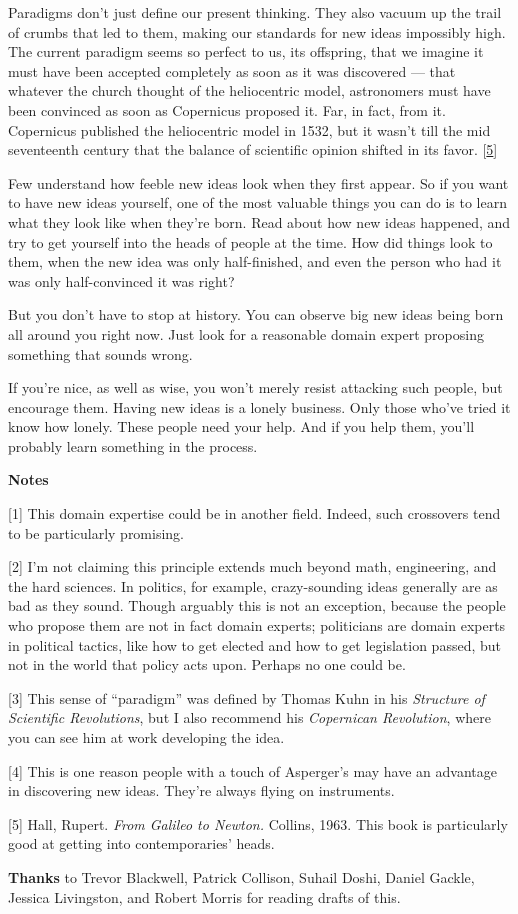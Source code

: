 Paradigms don't just define our present thinking. They also vacuum up
the trail of crumbs that led to them, making our standards for new ideas
impossibly high. The current paradigm seems so perfect to us, its
offspring, that we imagine it must have been accepted completely as soon
as it was discovered --- that whatever the church thought of the
heliocentric model, astronomers must have been convinced as soon as
Copernicus proposed it. Far, in fact, from it. Copernicus published the
heliocentric model in 1532, but it wasn't till the mid seventeenth
century that the balance of scientific opinion shifted in its favor.
{[}\hyperref[f5n]{5}{]}

Few understand how feeble new ideas look when they first appear. So if
you want to have new ideas yourself, one of the most valuable things you
can do is to learn what they look like when they're born. Read about how
new ideas happened, and try to get yourself into the heads of people at
the time. How did things look to them, when the new idea was only
half-finished, and even the person who had it was only half-convinced it
was right?

But you don't have to stop at history. You can observe big new ideas
being born all around you right now. Just look for a reasonable domain
expert proposing something that sounds wrong.

If you're nice, as well as wise, you won't merely resist attacking such
people, but encourage them. Having new ideas is a lonely business. Only
those who've tried it know how lonely. These people need your help. And
if you help them, you'll probably learn something in the process.

\textbf{Notes}

{[}1{]} This domain expertise could be in another field. Indeed, such
crossovers tend to be particularly promising.

{[}2{]} I'm not claiming this principle extends much beyond math,
engineering, and the hard sciences. In politics, for example,
crazy-sounding ideas generally are as bad as they sound. Though arguably
this is not an exception, because the people who propose them are not in
fact domain experts; politicians are domain experts in political
tactics, like how to get elected and how to get legislation passed, but
not in the world that policy acts upon. Perhaps no one could be.

{[}3{]} This sense of ``paradigm'' was defined by Thomas Kuhn in his
\emph{Structure of Scientific Revolutions}, but I also recommend his
\emph{Copernican Revolution}, where you can see him at work developing
the idea.

{[}4{]} This is one reason people with a touch of Asperger's may have an
advantage in discovering new ideas. They're always flying on
instruments.

{[}5{]} Hall, Rupert. \emph{From Galileo to Newton.} Collins, 1963. This
book is particularly good at getting into contemporaries' heads.

\textbf{Thanks} to Trevor Blackwell, Patrick Collison, Suhail Doshi,
Daniel Gackle, Jessica Livingston, and Robert Morris for reading drafts
of this.
